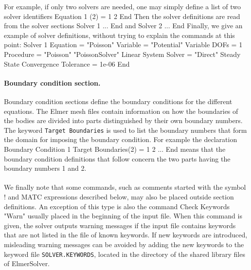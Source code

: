 For example, if only two solvers are needed, one may simply define a list of two solver identifiers 
\ttbegin
Equation 1
  (2) = 1 2
End
\ttend
Then the solver definitions are read from the solver sections 
\ttbegin
Solver 1
  ...
End
\ttend
and 
\ttbegin
Solver 2
  ...
End
\ttend
Finally, we give an example of solver definitions, without trying to explain the commands at this point:
\ttbegin
Solver 1
  Equation = "Poisson"
  Variable = "Potential"
  Variable DOFs = 1
  Procedure = "Poisson" "PoissonSolver"
  Linear System Solver = "Direct"
  Steady State Convergence Tolerance = 1e-06
End
\ttend

\paragraph{Boundary condition section.}Boundary condition sections define the boundary conditions for the different
equations. The Elmer mesh files contain information on how the boundaries of the bodies are divided
into parts distinguished by their own boundary numbers. The keyword {\tt Target Boundaries} is used to list 
the boundary numbers that form the domain for imposing the boundary condition. 
For example the declaration 
\ttbegin
Boundary  Condition 1
  Target Boundaries(2) = 1 2
  ...
End
\ttend
means that the boundary condition definitions that follow concern the two parts having the boundary numbers 1 and 2.

\paragraph{}
We finally note that some commands, such as comments started with the symbol ! and MATC expressions described below, 
may also be placed outside section definitions. An exception of this type is also the command
\ttbegin
Check Keywords "Warn"
\ttend
usually placed in the beginning of the input file. When this command is given, the solver 
outputs warning messages if the input file contains keywords that are not listed in the file
of known keywords. If new keywords are introduced, misleading warning messages can be avoided
by adding the new keywords to the keyword file {\tt SOLVER.KEYWORDS}, located in the directory
of the shared library files of ElmerSolver. 
 
